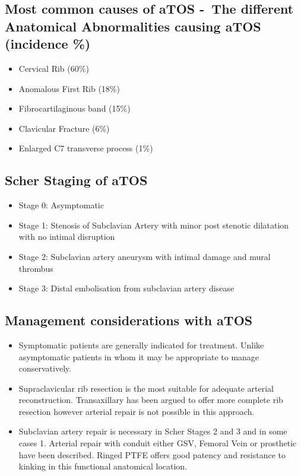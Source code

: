 \documentclass[
]{book}
\begin{document}
\hypertarget{most-common-causes-of-atos---the-different-anatomical-abnormalities-causing-atos-incidence}{%
\subsection{Most common causes of aTOS -~The different Anatomical Abnormalities causing aTOS (incidence \%)}\label{most-common-causes-of-atos---the-different-anatomical-abnormalities-causing-atos-incidence}}

\begin{itemize}
\item
  Cervical Rib (60\%)
\item
  Anomalous First Rib (18\%)
\item
  Fibrocartilaginous band (15\%)
\item
  Clavicular Fracture (6\%)
\item
  Enlarged C7 transverse process (1\%) \citet{boll122ThoracicOutlet2019}
\end{itemize}

\hypertarget{scher-staging-of-atos}{%
\subsection{Scher Staging of aTOS}\label{scher-staging-of-atos}}

\begin{itemize}
\item
  Stage 0: Asymptomatic
\item
  Stage 1: Stenosis of Subclavian Artery with minor post stenotic
  dilatation with no intimal disruption
\item
  Stage 2: Subclavian artery aneurysm with intimal damage and mural
  thrombus
\item
  Stage 3: Distal embolisation from subclavian artery disease
\end{itemize}

\hypertarget{management-considerations-with-atos}{%
\subsection{Management considerations with aTOS}\label{management-considerations-with-atos}}

\begin{itemize}
\item
  Symptomatic patients are generally indicated for treatment. Unlike
  asymptomatic patients in whom it may be appropriate to manage
  conservatively. \citet{boll122ThoracicOutlet2019}
\item
  Supraclavicular rib resection is the most suitable for adequate
  arterial reconstruction. Transaxillary has been argued to offer more
  complete rib resection however arterial repair is not possible in
  this approach.
\item
  Subclavian artery repair is necessary in Scher Stages 2 and 3 and in
  some cases 1. Arterial repair with conduit either GSV, Femoral Vein
  or prosthetic have been described. Ringed PTFE offers good patency
  and resistance to kinking in this functional anatomical location.~
\end{itemize}
\end{document}
